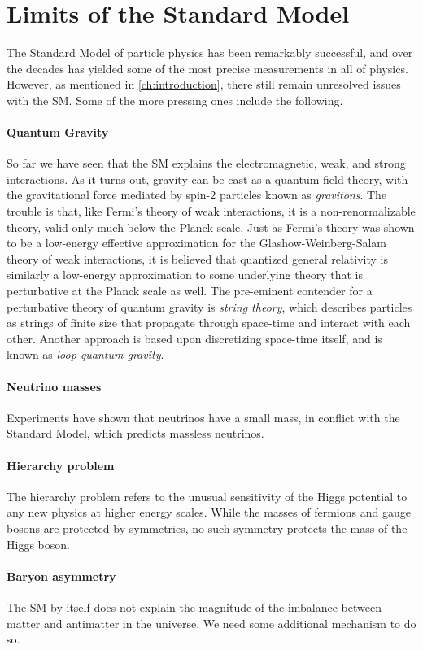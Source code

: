 \section{Limits of the Standard Model}
The Standard Model of particle physics has been remarkably successful, and over the decades has yielded some of the most precise measurements in all of physics. However, as mentioned in \autoref{ch:introduction}, there still remain unresolved issues with the SM. Some of the more pressing ones include the following.

\paragraph{Quantum Gravity} So far we have seen that the SM explains the electromagnetic, weak, and strong interactions. As it turns out, gravity can be cast as a quantum field theory, with the gravitational force mediated by spin-2 particles known as \emph{gravitons}. The trouble is that, like Fermi's theory of weak interactions, it is a non-renormalizable theory, valid only much below the Planck scale. Just as Fermi's theory was shown to be a low-energy effective approximation for the Glashow-Weinberg-Salam theory of weak interactions, it is believed that quantized general relativity is similarly a low-energy approximation to some underlying theory that is perturbative at the Planck scale as well. The pre-eminent contender for a perturbative theory of quantum gravity is \emph{string theory}, which describes particles as strings of finite size that propagate through space-time and interact with each other. Another approach is based upon discretizing space-time itself, and is known as \emph{loop quantum gravity}.

\paragraph{Neutrino masses} Experiments have shown that neutrinos have a small mass, in conflict with the Standard Model, which predicts massless neutrinos. 
\paragraph{Hierarchy problem}
The hierarchy problem refers to the unusual sensitivity of the Higgs potential to any new physics at higher energy scales. While the masses of fermions and gauge bosons are protected by symmetries, no such symmetry protects the mass of the Higgs boson. 
\paragraph{Baryon asymmetry} The SM by itself does not explain the magnitude of the imbalance between matter and antimatter in the universe. We need some additional mechanism to do so.
